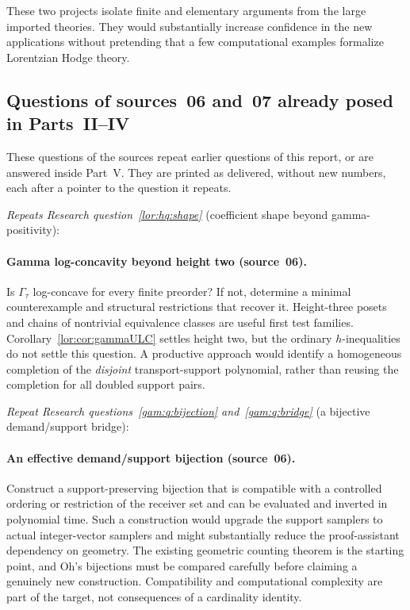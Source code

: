 \documentclass[11pt]{article}
\numberwithin{equation}{section}
\theoremstyle{definition}
\begin{document}
These two projects isolate finite and elementary arguments from the large
imported theories. They would substantially increase confidence in the new
applications without pretending that a few computational examples formalize
Lorentzian Hodge theory.


\subsection{Questions of sources~06 and~07 already posed in Parts~II--IV}
\label{lor:sec:oldquestions}
These questions of the sources repeat earlier questions of this report, or
are answered inside Part~V. They are printed as delivered, without new
numbers, each after a pointer to the question it repeats.

\noindent\emph{Repeats Research question~\ref{lor:hq:shape}} (coefficient
shape beyond gamma-positivity):
\paragraph{Gamma log-concavity beyond height two (source~06).}
Is $\Gamma_\tau$ log-concave for every finite preorder? If not, determine a
minimal counterexample and structural restrictions that recover it.
Height-three posets and chains of nontrivial equivalence classes are useful
first test families. Corollary~\ref{lor:cor:gammaULC} settles height two, but the
ordinary $h$-inequalities do not settle this question.
A productive approach would identify a homogeneous completion of the
\emph{disjoint} transport-support polynomial, rather than reusing the
completion for all doubled support pairs.


\noindent\emph{Repeat Research questions~\ref{gam:q:bijection}
and~\ref{gam:q:bridge}} (a bijective demand/support bridge):
\paragraph{An effective demand/support bijection (source~06).}
Construct a support-preserving bijection that is compatible with a
controlled ordering or restriction of the receiver set and can be
evaluated and inverted in polynomial time. Such a construction would
upgrade the support samplers to actual integer-vector samplers and might
substantially reduce the proof-assistant dependency on geometry.
The existing geometric counting theorem is the starting point, and Oh's
bijections must be compared carefully before claiming a genuinely new
construction. Compatibility and computational complexity are part of the
target, not consequences of a cardinality identity.
\end{document}
